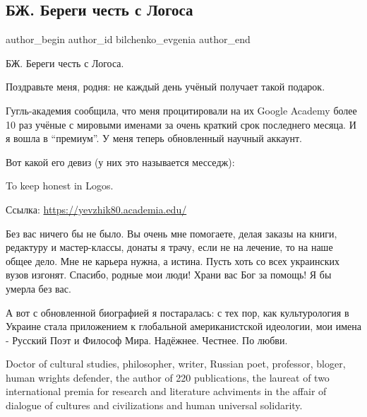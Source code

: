  
 
 
 
 
 
\subsection{БЖ. Береги честь с Логоса}
\label{sec:09_06_2021.fb.bilchenko_evgenia.3.beregi_chest_s_logosa}
\ifcmt
 author_begin
   author_id bilchenko_evgenia
 author_end
\fi

БЖ. Береги честь с Логоса.

Поздравьте меня, родня: не каждый день учёный получает такой подарок. 

Гугль-академия сообщила, что меня процитировали на их Google Academy более 10
раз учёные с мировыми именами за очень краткий срок последнего месяца. И я
вошла в \enquote{премиум}. У меня теперь  обновленный научный аккаунт. 

Вот какой его девиз (у них это называется месседж):

To keep honest in Logos.

Ссылка: \url{https://yevzhik80.academia.edu/}

Без вас ничего бы не было. Вы очень мне помогаете, делая заказы на книги,
редактуру и мастер-классы, донаты я трачу, если не на лечение, то на наше общее
дело. Мне не карьера нужна, а истина. Пусть хоть со всех украинских вузов
изгонят. Спасибо, родные мои люди! Храни вас Бог за помощь! Я бы умерла без
вас.

А вот с обновленной биографией я постаралась: с тех пор, как культурология в
Украине стала приложением к глобальной американистской идеологии, мои имена -
Русский Поэт и Философ Мира. Надёжнее. Честнее. По любви.

Doctor of cultural studies, philosopher, writer, Russian poet, professor,
bloger, human wrights defender, the author of 220 publications, the laureat of
two international premia for research and literature achviments in the affair
of dialogue of cultures and civilizations and human universal solidarity.

